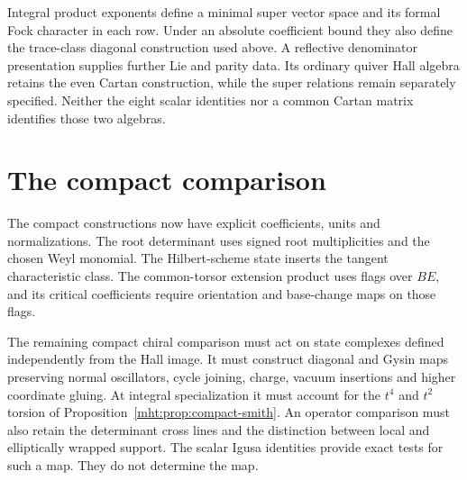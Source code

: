 Integral product exponents define a minimal super vector
space and its formal Fock character in each row.
Under an absolute coefficient bound they also define
the trace-class diagonal construction used above.
A reflective denominator presentation supplies further
Lie and parity data. Its ordinary quiver Hall algebra
retains the even Cartan construction, while the super
relations remain separately specified.
Neither the eight scalar identities nor a common Cartan
matrix identifies those two algebras.

\section{The compact comparison}

The compact constructions now have explicit coefficients,
units and normalizations. The root determinant uses signed
root multiplicities and the chosen Weyl monomial.
The Hilbert-scheme state inserts the tangent characteristic
class. The common-torsor extension product uses flags over
\(BE\), and its critical coefficients require orientation
and base-change maps on those flags.

The remaining compact chiral comparison must act on state
complexes defined independently from the Hall image.
It must construct diagonal and Gysin maps preserving normal
oscillators, cycle joining, charge, vacuum insertions and
higher coordinate gluing.
At integral specialization it must account for the
\(t^4\) and \(t^2\) torsion of
Proposition~\ref{mht:prop:compact-smith}.
An operator comparison must also retain the determinant
cross lines and the distinction between local and
elliptically wrapped support.
The scalar Igusa identities provide exact tests for such
a map. They do not determine the map.
